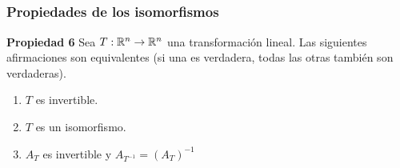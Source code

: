 
\subsection{}

\begin{frame}\frametitle{Propiedades de los isomorfismos}
	
	\begin{prop}{\textbf{Propiedad 6}}
		\justifying
		Sea $T:\mathbb{R}^n\to \mathbb{R}^n$ una transformación lineal. Las siguientes afirmaciones 
		son equivalentes (si una es verdadera, todas las otras también son verdaderas). 
		\begin{enumerate}[$a$]
			\item $T$ es invertible.			
			\item $T$ es un isomorfismo.
			\item  $A_T$ es invertible y $A_{T^{-1}}= \left(A_T\right)^{-1}$
		\end{enumerate}
	\end{prop}	
	
	
\end{frame}



\subsection{}

